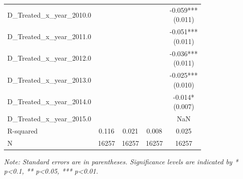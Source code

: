 \documentclass{article}
\begin{document}
\begin{table}[h!]
\begin{tabular}{lcccc}
        D\_Treated\_x\_year\_2010.0 &                     &             &                  & \makecell{-0.059*** \\ (0.011)} \\
        D\_Treated\_x\_year\_2011.0 &                     &             &                  & \makecell{-0.051*** \\ (0.011)} \\
        D\_Treated\_x\_year\_2012.0 &                     &             &                  & \makecell{-0.036*** \\ (0.011)} \\
        D\_Treated\_x\_year\_2013.0 &                     &             &                  & \makecell{-0.025*** \\ (0.010)} \\
        D\_Treated\_x\_year\_2014.0 &                     &             &                  & \makecell{-0.014*   \\ (0.007)}   \\
        D\_Treated\_x\_year\_2015.0 &                     &             &                  & NaN                 \\
        \midrule
        R-squared                   & 0.116               & 0.021       & 0.008            & 0.025               \\
        N                           & 16257               & 16257       & 16257            & 16257               \\
        \bottomrule
    \end{tabular}
    \newline
    \textit{Note: Standard errors are in parentheses. Significance levels are indicated by * p\textless 0.1, ** p\textless 0.05, *** p\textless 0.01.}
\end{table}
\end{document}

